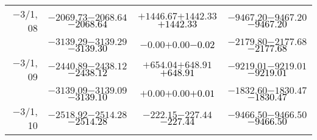 \documentclass[compress]{beamer}
\begin{document}
\begin{frame}
{\begin{tabular}{r | c | c | c}
$-$3/1, 08 & $-2069.73$\hspace{0.1 cm}$-2068.64$\hspace{0.1 cm}\textcolor{black}{$-2068.64$} & $+1446.67$\hspace{0.1 cm}$+1442.33$\hspace{0.1 cm}\textcolor{black}{$+1442.33$} & $-9467.20$\hspace{0.1 cm}$-9467.20$\hspace{0.1 cm}\textcolor{black}{$-9467.20$} \\
           & $-3139.29$\hspace{0.1 cm}$-3139.29$\hspace{0.1 cm}\textcolor{black}{$-3139.30$} & $-0.00$\hspace{0.1 cm}$+0.00$\hspace{0.1 cm}\textcolor{black}{$-0.02$} & $-2179.80$\hspace{0.1 cm}$-2177.68$\hspace{0.1 cm}\textcolor{black}{$-2177.68$} \\
$-$3/1, 09 & $-2440.89$\hspace{0.1 cm}$-2438.12$\hspace{0.1 cm}\textcolor{black}{$-2438.12$} & $+654.04$\hspace{0.1 cm}$+648.91$\hspace{0.1 cm}\textcolor{black}{$+648.91$} & $-9219.01$\hspace{0.1 cm}$-9219.01$\hspace{0.1 cm}\textcolor{black}{$-9219.01$} \\
           & $-3139.09$\hspace{0.1 cm}$-3139.09$\hspace{0.1 cm}\textcolor{black}{$-3139.10$} & $+0.00$\hspace{0.1 cm}$+0.00$\hspace{0.1 cm}\textcolor{black}{$+0.01$} & $-1832.60$\hspace{0.1 cm}$-1830.47$\hspace{0.1 cm}\textcolor{black}{$-1830.47$} \\
$-$3/1, 10 & $-2518.92$\hspace{0.1 cm}$-2514.28$\hspace{0.1 cm}\textcolor{black}{$-2514.28$} & $-222.15$\hspace{0.1 cm}$-227.44$\hspace{0.1 cm}\textcolor{black}{$-227.44$} & $-9466.50$\hspace{0.1 cm}$-9466.50$\hspace{0.1 cm}\textcolor{black}{$-9466.50$} \\

\end{tabular}}
\end{frame}
\end{document}
